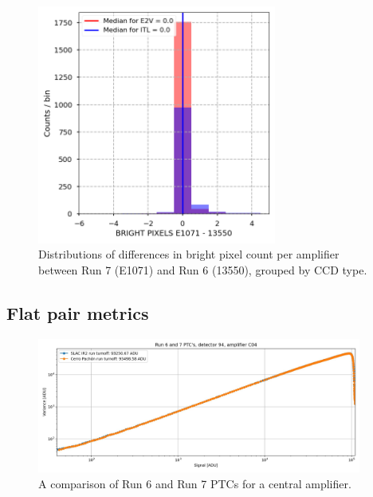 \begin{figure}[ht]
\begin{centering}
\includegraphics[width=0.7\textwidth]{figures/baselineCharacterization/BRIGHT_PIXELS_13550_E1071_diff.png}
\caption{Distributions of differences in bright pixel count per amplifier between Run 7 (E1071) and Run 6 (13550), grouped by CCD type.}
\label{fig:dark-dist}
\end{centering}
\end{figure}

\clearpage
\subsection{Flat pair metrics}\label{flat-pair-metrics}

\begin{figure}[ht]
\begin{centering}
\includegraphics[width=0.95\textwidth]{figures/baselineCharacterization/run7PTCsToDate.jpg}
\caption{A comparison of Run 6 and Run 7 PTCs for a central amplifier.}
\label{fig:initRever:PTC_Comparison}
\end{centering}
\end{figure}

